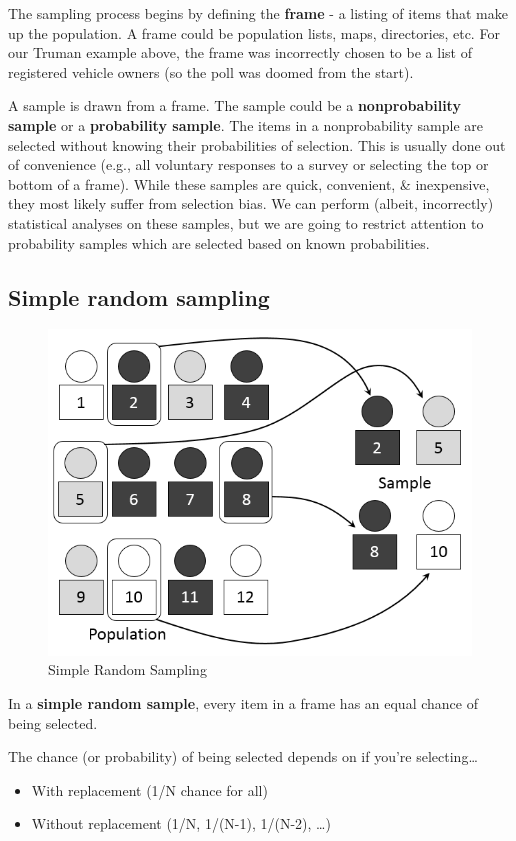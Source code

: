 \documentclass[
]{book}
\providecommand{\tightlist}{%
  \setlength{\itemsep}{0pt}\setlength{\parskip}{0pt}}
\begin{document}
The sampling process begins by defining the \textbf{frame} - a listing of items that make up the population. A frame could be population lists, maps, directories, etc. For our Truman example above, the frame was incorrectly chosen to be a list of registered vehicle owners (so the poll was doomed from the start).

A sample is drawn from a frame. The sample could be a \textbf{nonprobability sample} or a \textbf{probability sample}. The items in a nonprobability sample are selected without knowing their probabilities of selection. This is usually done out of convenience (e.g., all voluntary responses to a survey or selecting the top or bottom of a frame). While these samples are quick, convenient, \& inexpensive, they most likely suffer from selection bias. We can perform (albeit, incorrectly) statistical analyses on these samples, but we are going to restrict attention to probability samples which are selected based on known probabilities.

\hypertarget{simple-random-sampling}{%
\subsection{Simple random sampling}\label{simple-random-sampling}}

\begin{figure}

{\centering \includegraphics[width=0.5\linewidth]{images/random} 

}

\caption{Simple Random Sampling}\label{fig:unnamed-chunk-23}
\end{figure}

In a \textbf{simple random sample}, every item in a frame has an equal chance of being selected.

The chance (or probability) of being selected depends on if you're selecting\ldots{}

\begin{itemize}
\tightlist
\item
  With replacement (1/N chance for all)
\item
  Without replacement (1/N, 1/(N-1), 1/(N-2), \ldots)
\end{itemize}
\end{document}
